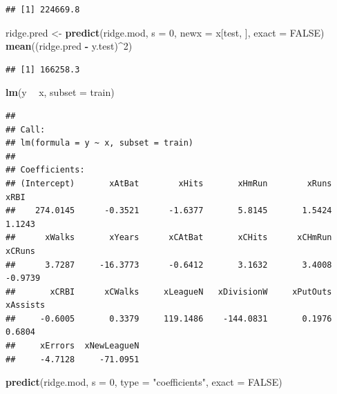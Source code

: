 \documentclass[
  12pt,
]{book}
\newenvironment{Shaded}{\begin{snugshade}}{\end{snugshade}}
\newcommand{\DataTypeTok}[1]{\textcolor[rgb]{0.13,0.29,0.53}{#1}}
\newcommand{\DecValTok}[1]{\textcolor[rgb]{0.00,0.00,0.81}{#1}}
\newcommand{\KeywordTok}[1]{\textcolor[rgb]{0.13,0.29,0.53}{\textbf{#1}}}
\newcommand{\NormalTok}[1]{#1}
\newcommand{\OperatorTok}[1]{\textcolor[rgb]{0.81,0.36,0.00}{\textbf{#1}}}
\newcommand{\OtherTok}[1]{\textcolor[rgb]{0.56,0.35,0.01}{#1}}
\newcommand{\StringTok}[1]{\textcolor[rgb]{0.31,0.60,0.02}{#1}}
\theoremstyle{definition}
\theoremstyle{definition}
\theoremstyle{definition}
\theoremstyle{remark}
\begin{document}
\begin{verbatim}
## [1] 224669.8
\end{verbatim}

\begin{Shaded}
\begin{Highlighting}[]
\NormalTok{ridge.pred <-}\StringTok{ }\KeywordTok{predict}\NormalTok{(ridge.mod, }\DataTypeTok{s =} \DecValTok{0}\NormalTok{, }\DataTypeTok{newx =}\NormalTok{ x[test, }
\NormalTok{    ], }\DataTypeTok{exact =} \OtherTok{FALSE}\NormalTok{)}
\KeywordTok{mean}\NormalTok{((ridge.pred }\OperatorTok{-}\StringTok{ }\NormalTok{y.test)}\OperatorTok{^}\DecValTok{2}\NormalTok{)}
\end{Highlighting}
\end{Shaded}

\begin{verbatim}
## [1] 166258.3
\end{verbatim}

\begin{Shaded}
\begin{Highlighting}[]
\KeywordTok{lm}\NormalTok{(y }\OperatorTok{~}\StringTok{ }\NormalTok{x, }\DataTypeTok{subset =}\NormalTok{ train)}
\end{Highlighting}
\end{Shaded}

\begin{verbatim}
## 
## Call:
## lm(formula = y ~ x, subset = train)
## 
## Coefficients:
## (Intercept)       xAtBat        xHits       xHmRun        xRuns         xRBI  
##    274.0145      -0.3521      -1.6377       5.8145       1.5424       1.1243  
##      xWalks       xYears      xCAtBat       xCHits      xCHmRun       xCRuns  
##      3.7287     -16.3773      -0.6412       3.1632       3.4008      -0.9739  
##       xCRBI      xCWalks     xLeagueN   xDivisionW     xPutOuts     xAssists  
##     -0.6005       0.3379     119.1486    -144.0831       0.1976       0.6804  
##     xErrors  xNewLeagueN  
##     -4.7128     -71.0951
\end{verbatim}

\begin{Shaded}
\begin{Highlighting}[]
\KeywordTok{predict}\NormalTok{(ridge.mod, }\DataTypeTok{s =} \DecValTok{0}\NormalTok{, }\DataTypeTok{type =} \StringTok{"coefficients"}\NormalTok{, }\DataTypeTok{exact =} \OtherTok{FALSE}\NormalTok{)}
\end{Highlighting}
\end{Shaded}
\end{document}
